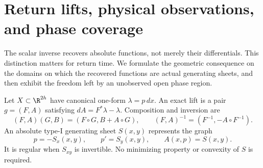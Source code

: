 \section{Return lifts, physical observations, and phase coverage}
\label{sec:v83-geometry}

The scalar inverse recovers absolute functions, not merely their differentials.
This distinction matters for return time. We formulate the geometric
consequence on the domains on which the recovered functions are actual
generating sheets, and then exhibit the freedom left by an unobserved
open phase region.

Let $X\subset\R^{2h}$ have canonical one-form $\lambda=p\,dx$.
An exact lift is a pair $g=(F,A)$ satisfying $dA=F^*\lambda-\lambda$.
Composition and inversion are
\begin{equation}\label{eq:v83-lifts}
 (F,A)(G,B)=(F\circ G,B+A\circ G),\qquad
 (F,A)^{-1}=(F^{-1},-A\circ F^{-1}).
\end{equation}
An absolute type-I generating sheet $S(x,y)$ represents the graph
\begin{equation}\label{eq:v83-generating}
 p=-S_x(x,y),\qquad p'=S_y(x,y),\qquad A(x,p)=S(x,y).
\end{equation}
It is regular when $S_{xy}$ is invertible. No minimizing property or
convexity of $S$ is required.

